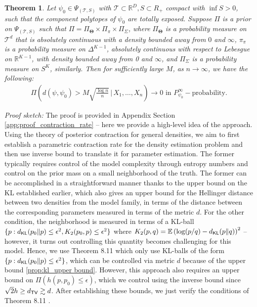 \documentclass[bj,authoryear]{imsart}
\theoremstyle{plain}
\newtheorem{theorem}{Theorem}
\theoremstyle{remark}
\def\bTheta{{\boldsymbol\Theta}}
\def\bbE{\mathbb{E}}
\def\bbR{\mathbb{R}}
\def\cT{\mathcal{T}}
\def\KL{{\sf KL}}
\def\TV{{\sf TV}}
\def\bTheta{\boldsymbol{\Theta}}
\begin{document}
\begin{theorem}\label{thm:density_contraction}
    Let $\psi_0\in \Psi_{(\cT,S)}$ with $\cT\subset\bbR^D,S\subset R_+$ compact with $\inf S > 0$, such that the component polytopes of $\psi_0$ are totally exposed. Suppose $\Pi$ is a prior on $\Psi_{(\cT,S)}$ such that $\Pi=\Pi_{\bTheta}\times \Pi_{\pi}\times \Pi_{\Sigma}$, where $\Pi_{\bTheta}$ is a probability measure on $\cT^d$ that is absolutely continuous with a density bounded away from $0$ and $\infty$, $\pi_{\pi}$ is a probability measure on $\Delta^{K-1}$, absolutely continuous with respect to Lebesgue on $\bbR^{K-1}$, with density bounded away from 0 and $\infty$, and $\Pi_{\Sigma}$ is a probability measure on $S^K$, similarly.
    Then for sufficiently large $M$, as $n\to\infty$, we have the following:
    \begin{align}
        \Pi\left(d(\psi, \psi_0) > M\sqrt{\frac{\log n}{n}} \,\Big| \, X_1,\dots, X_n\right) \to 0 \text{ in } P_{\psi_0}^{\infty}-\text{probability}.
    \end{align}
\end{theorem}
 
\textit{Proof sketch: } The proof is provided in Appendix Section \ref{app:proof_contraction_rate} -- here we provide a high-level idea of the approach. Using the theory of posterior contraction for general densities, we aim to first establish a parametric contraction rate for the density estimation problem and then use inverse bound to translate it for parameter estimation. The former typically requires control of the model complexity through entropy numbers and control on the prior mass on a small neighborhood of the truth. The former can be accomplished in a straightforward manner thanks to the upper bound on the KL established earlier, which also gives an upper bound for the Hellinger distance between two densities from the model family, in terms of the distance between the corresponding parameters measured in terms of the metric $d$. For the other condition, the neighborhood is measured in terms of a KL-ball $\{p: d_{\KL}(p_0\Vert p)\leq \epsilon^2, K_2(p_0,p)\leq \epsilon^2\}$ where $K_2(p,q)=\bbE\left(\log (p/q) - d_{\KL}(p\Vert q)\right)^2$ -- however, it turns out controlling this quantity becomes challenging for this model. Hence, we use Theorem 8.11 \cite{ghosal2017fundamentals} which only use KL-balls of the form $\{p:d_{\KL}(p_0\Vert p)\leq \epsilon^2\}$, which can be controlled via metric $d$ because of the upper bound \ref{prop:kl_upper bound}. However, this approach also requires an upper bound on $\Pi(h(p,p_0)\leq \epsilon)$, which we control using the inverse bound since $\sqrt{2} h \geq d_{\TV} \gtrsim d$. After establishing these bounds, we just verify the conditions of Theorem 8.11 \cite{ghosal2017fundamentals}.
\end{document}
